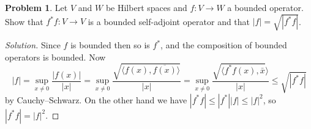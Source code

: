\documentclass[11pt]{article}
\theoremstyle{definition}
\newtheorem{prob}{Problem}
\def\<{\langle}
\def\>{\rangle}
\begin{document}
\begin{prob}
	Let $V$ and $W$ be Hilbert spaces and $f : V \to W$ a bounded operator.
	Show that $f^* f : V \to V$ is a bounded self-adjoint operator and that $|f| = \sqrt{|f^* f|}$.
\end{prob}

\begin{proof}[Solution]
	Since $f$ is bounded then so is $f^*$, and the composition of bounded operators is bounded. Now
	\[
		|f|
		= \sup_{x\not=0} \frac{|f(x)|}{|x|}
		= \sup_{x\not=0} \frac{\sqrt{\<f(x), \overline{f(x)}\>}}{|x|}
		= \sup_{x\not=0} \frac{\sqrt{\<f^*f(x), \bar x}\>}{|x|}
		\leq \sqrt{|f^*f|}
	\]
	by Cauchy--Schwarz.
	On the other hand we have $|f^*f| \leq |f^*||f| \leq |f|^2$, so $|f^*f| = |f|^2$.
\end{proof}
\end{document}
